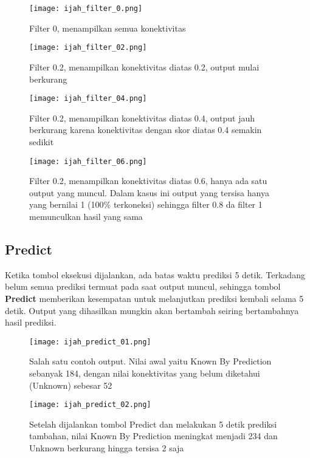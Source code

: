 	\begin{figure}[H]
	\centering
	\texttt{[image: ijah\_filter\_0.png]}
	\caption{Filter 0, menampilkan semua konektivitas}
	\label{fig:ijah_filter_0}
	\end{figure}

	\begin{figure}[H]
	\centering
	\texttt{[image: ijah\_filter\_02.png]}
	\caption{Filter 0.2, menampilkan konektivitas diatas 0.2, output mulai berkurang}
	\label{fig:ijah_filter_02}
	\end{figure}

	\begin{figure}[H]
	\centering
	\texttt{[image: ijah\_filter\_04.png]}
	\caption{Filter 0.2, menampilkan konektivitas diatas 0.4, output jauh berkurang karena konektivitas dengan skor diatas 0.4 semakin sedikit}
	\label{fig:ijah_filter_04}
	\end{figure}

	\begin{figure}[H]
	\centering
	\texttt{[image: ijah\_filter\_06.png]}
	\caption{Filter 0.2, menampilkan konektivitas diatas 0.6, hanya ada satu output yang muncul. Dalam kasus ini output yang tersisa hanya yang bernilai 1 (100\% terkoneksi) sehingga filter 0.8 da filter 1 memunculkan hasil yang sama}
	\label{fig:ijah_filter_02}
	\end{figure}

	\subsection{Predict} \label{predictmore}
	Ketika tombol eksekusi dijalankan, ada batas waktu prediksi 5 detik. Terkadang belum semua prediksi termuat pada saat output muncul, sehingga tombol \textbf{Predict} memberikan kesempatan untuk melanjutkan prediksi kembali selama 5 detik. Output yang dihasilkan mungkin akan bertambah seiring bertambahnya hasil prediksi.

	\begin{figure}[H]
	\centering
	\texttt{[image: ijah\_predict\_01.png]}
	\caption{Salah satu contoh output. Nilai awal yaitu Known By Prediction sebanyak 184, dengan nilai konektivitas yang belum diketahui (Unknown) sebesar 52}
	\label{fig:ijah_predict_01}
	\end{figure}

	\begin{figure}[H]
	\centering
	\texttt{[image: ijah\_predict\_02.png]}
	\caption{Setelah dijalankan tombol Predict dan melakukan 5 detik prediksi tambahan, nilai Known By Prediction meningkat menjadi 234 dan Unknown berkurang hingga tersisa 2 saja}
	\label{fig:ijah_predict_02}
	\end{figure}
